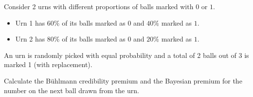 \documentclass[notoc,notitlepage]{tufte-book}
\begin{document}
\begin{eg}\label{eg:disagreement_of_buhlmann_credibility_premium_and_bayesian_premium}
  Consider 2 urns with different proportions of balls marked with $0$ or $1$.
  \begin{itemize}
    \item Urn 1 has $60\%$ of its balls marked as $0$ and $40\%$ marked as $1$.
    \item Urn 2 has $80\%$ of its balls marked as $0$ and $20\%$ marked as $1$.
  \end{itemize}
  An urn is randomly picked with equal probability and a total of 2 balls out of
  3 is marked 1 (with replacement).

  Calculate the B\"{u}hlmann credibility premium and the Bayesian premium for
  the number on the next ball drawn from the urn.
\end{eg}
\end{document}
